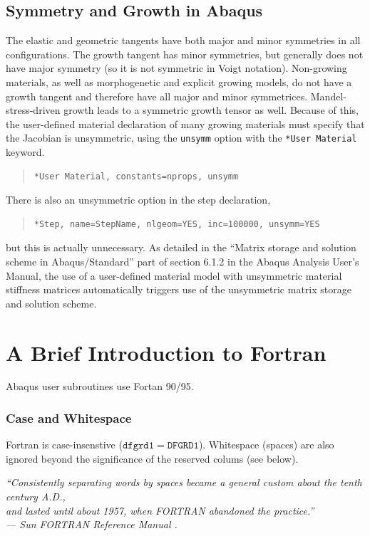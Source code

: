 \documentclass[10pt,letterpaper,oneside]{report}
\begin{document}
\begin{itemize}
\section{Symmetry and Growth in Abaqus}
The elastic and geometric tangents have both major and minor symmetries in all configurations.  The growth tangent has minor symmetries, but generally does not have major symmetry (so it is not symmetric in Voigt notation).  Non-growing materials, as well as morphogenetic and explicit growing models, do not have a growth tangent and therefore have all major and minor symmetrices.  Mandel-stress-driven growth leads to a symmetric growth tensor as well.  Because of this, the user-defined material declaration of many growing materials must specify that the Jacobian is unsymmetric, using the \texttt{unsymm} option with the \texttt{*User Material} keyword. 
\begin{quote} 
    \begin{lstlisting}[]
      *User Material, constants=nprops, unsymm
    \end{lstlisting} \end{quote}
    There is also an unsymmetric option in the step declaration, 
    \begin{quote} \begin{lstlisting}[]
      *Step, name=StepName, nlgeom=YES, inc=100000, unsymm=YES
    \end{lstlisting} 
\end{quote}
but this is actually unnecessary.  As detailed in the ``Matrix storage and solution scheme in Abaqus/Standard'' part of section 6.1.2 in the Abaqus Analysis User's Manual, the use of a user-defined material model with unsymmetric material stiffness matrices automatically triggers use of the unsymmetric matrix storage and solution scheme.  


\chapter{A Brief Introduction to Fortran}
Abaqus user subroutines use Fortan 90/95.  

\subsection{Case and Whitespace}
Fortran is case-insenstive ($\mathtt{dfgrd1} = \mathtt{DFGRD1}$).  Whitespace (spaces) are also ignored beyond the significance of the reserved colums (see below).

\begin{center}
\emph{“Consistently separating words by spaces became a general custom about the tenth century A.D., \\ and lasted until about 1957, when FORTRAN abandoned the practice.” \\
— Sun FORTRAN Reference Manual .}
\end{center}


\end{itemize}
\end{document}
